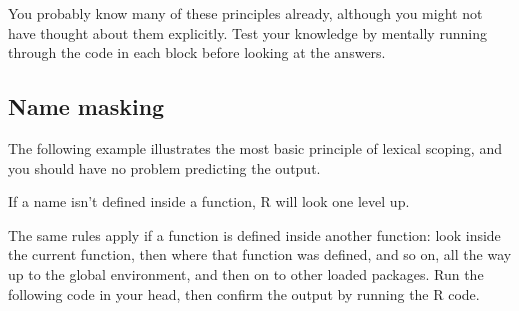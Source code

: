 You probably know many of these principles already, although you might
not have thought about them explicitly. Test your knowledge by mentally
running through the code in each block before looking at the answers.

\subsection{Name masking}

The following example illustrates the most basic principle of lexical
scoping, and you should have no problem predicting the output.

\begin{Shaded}
\begin{Highlighting}[]
\StringTok{ }
  \StringTok{ }
  \StringTok{ }
\NormalTok{\}}
\NormalTok{()}
\end{Highlighting}
\end{Shaded}

If a name isn't defined inside a function, R will look one level up.

\begin{Shaded}
\begin{Highlighting}[]
\StringTok{ }
\StringTok{ }
  \StringTok{ }
\NormalTok{\}}
\NormalTok{()}
\end{Highlighting}
\end{Shaded}

The same rules apply if a function is defined inside another function:
look inside the current function, then where that function was defined,
and so on, all the way up to the global environment, and then on to
other loaded packages. Run the following code in your head, then confirm
the output by running the R code.

\begin{Shaded}
\begin{Highlighting}[]
\StringTok{ }
\StringTok{ }
  \StringTok{ }
  \StringTok{ }
    \StringTok{ }
  \NormalTok{\}}
  \NormalTok{()}
\NormalTok{\}}
\NormalTok{()}
\end{Highlighting}
\end{Shaded}

